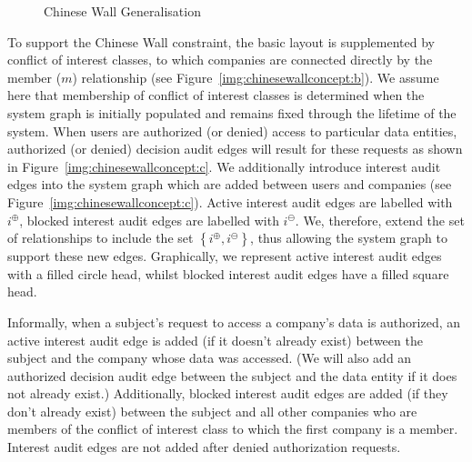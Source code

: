 \documentclass{article}
\newcommand{\set}[1]{\ensuremath{\left\{#1\right\}}} \newcommand{\sett}[1]{\ensuremath{\left\{\textit{#1}\right\}}} \newcommand{\tuple}[1]{\ensuremath{\left(#1\right)}} \newcommand{\tuplet}[1]{\ensuremath{\left(\textit{#1}\right)}}
\newcommand{\audita}[1]{\ensuremath{#1^\oplus}}
\newcommand{\auditd}[1]{\ensuremath{#1^\ominus}}
\newcommand{\interesta}{\ensuremath{i^\oplus}}
\newcommand{\interestb}{\ensuremath{i^\ominus}}
\newcommand{\setinterest}{\ensuremath{\set{i^\oplus,i^\ominus}}}
\begin{document}
\begin{figure}[!ht]
{
        \label{img:chinesewallconcept:c}
    }
    \caption{Chinese Wall Generalisation}\label{img:chinesewallconcept}
\end{figure}

To support the Chinese Wall constraint, the basic layout is supplemented by conflict of interest classes, to which companies are connected directly by the member ($m$) relationship (see Figure~\ref{img:chinesewallconcept:b}).
We assume here that membership of conflict of interest classes is determined when the system graph is initially populated and remains fixed through the lifetime of the system.
When users are authorized (or denied) access to particular data entities, authorized (or denied) decision audit edges will result for these requests as shown in Figure~\ref{img:chinesewallconcept:c}.
We additionally introduce interest audit edges into the system graph which are added between users and companies (see Figure~\ref{img:chinesewallconcept:c}).
Active interest audit edges are labelled with \interesta, blocked interest audit edges are labelled with \interestb.
We, therefore, extend the set of relationships to include the set $\setinterest$, thus allowing the system graph to support these new edges.
Graphically, we represent active interest audit edges with a filled circle head, whilst blocked interest audit edges have a filled square head.

Informally, when a subject's request to access a company's data is authorized, an active interest audit edge is added (if it doesn't already exist) between the subject and the company whose data was accessed.
(We will also add an authorized decision audit edge between the subject and the data entity if it does not already exist.)
Additionally, blocked interest audit edges are added (if they don't already exist) between the subject and all other companies who are members of the conflict of interest class to which the first company is a member.
Interest audit edges are not added after denied authorization requests.
\end{document}
